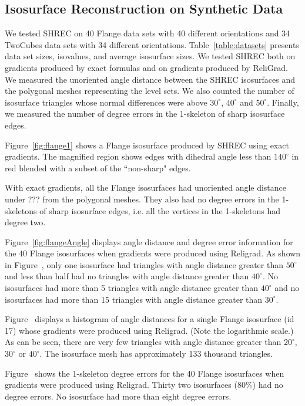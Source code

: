\subsection{Isosurface Reconstruction on Synthetic Data}
\label{section:synthetic_tests}

We tested SHREC on 40 Flange data sets with 40 different orientations
and 34 TwoCubes data sets with 34 different orientations.
Table~\ref{table:datasets} presents data set sizes, isovalues,
and average isosurface sizes.
We tested SHREC both on gradients produced by exact formulas 
and on gradients produced by ReliGrad.
We measured the unoriented angle distance between the SHREC isosurfaces
and the polygonal meshes representing the level sets.
We also counted the number of isosurface triangles whose normal differences
were above $30^\circ$, $40^\circ$ and $50^\circ$.
Finally, we measured the number of degree errors 
in the 1-skeleton of sharp isosurface edges.

Figure~\ref{fig:flange1} shows a Flange isosurface produced by SHREC
using exact gradients.
The magnified region shows edges with dihedral angle
less than $140^\circ$ in red blended with a subset of the ``non-sharp"
edges.

With exact gradients,
all the Flange isosurfaces had unoriented angle distance
under ??? from the polygonal meshes.
They also had no degree errors in the 1-skeletons
of sharp isosurface edges,
i.e. all the vertices in the 1-skeletons had degree two.

Figure~\ref{fig:flangeAngle} displays angle distance and degree error
information for the 40 Flange isosurfaces
when gradients were produced using Religrad.
As shown in Figure~,
only one isosurface had triangles with angle distance greater than $50^\circ$
and less than half had no triangles with angle distance greater than $40^\circ$.
No isosurfaces had more than 5 triangles with angle distance
greater than $40^\circ$
and no isosurfaces had more than 15 triangles with angle distance greater
than $30^\circ$.

Figure~ displays a histogram of angle distances
for a single Flange isosurface (id 17) 
whose gradients were produced using Religrad.
(Note the logarithmic scale.)
As can be seen,
there are very few triangles with angle distance
greater than $20^\circ$, $30^\circ$ or $40^\circ$.
The isosurface mesh has approximately 133
thousand triangles. 

Figure~\protect{} shows the 1-skeleton degree errors
for the 40 Flange isosurfaces when gradients were produced using Religrad.
Thirty two isosurfaces (80$\%$) had no degree errors.
No isosurface had more than eight degree errors.

